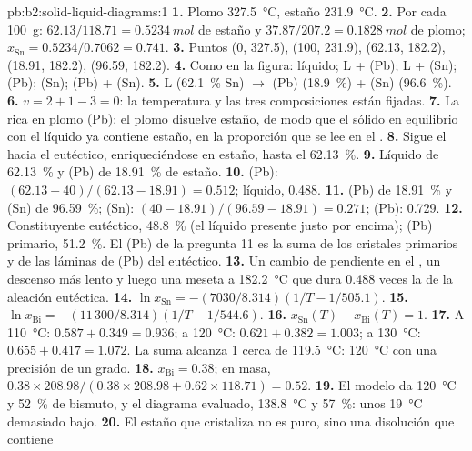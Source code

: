 \begin{solution}{pb:b2:solid-liquid-diagrams:1}
\textbf{1.} Plomo \qty{327.5}{\degreeCelsius}, estaño \qty{231.9}{\degreeCelsius}.
\textbf{2.} Por cada \qty{100}{g}: $62.13/118.71 = \qty{0.5234}{mol}$ de estaño y
$37.87/207.2 = \qty{0.1828}{mol}$ de plomo; $x_{\mathrm{Sn}} = 0.5234/0.7062 =
0.741$.
\textbf{3.} Puntos (0, 327.5), (100, 231.9), (62.13, 182.2), (18.91, 182.2),
(96.59, 182.2).
\textbf{4.} Como en la figura: líquido; L + (Pb); L + (Sn); (Pb); (Sn); (Pb) + (Sn).
\textbf{5.} L (62.1~\% Sn) $\longrightarrow$ (Pb) (18.9~\%) + (Sn) (96.6~\%).
\textbf{6.} $v = 2 + 1 - 3 = 0$: la temperatura y las tres composiciones están
fijadas.
\textbf{7.} La  rica en plomo (Pb): el plomo disuelve estaño, de modo que el sólido en
equilibrio con el líquido ya contiene estaño, en la proporción que se lee en el
.
\textbf{8.} Sigue el  hacia el eutéctico, enriqueciéndose en estaño,
hasta el 62.13~\%.
\textbf{9.} Líquido de 62.13~\% y (Pb) de 18.91~\% de estaño.
\textbf{10.} (Pb): $(62.13 - 40)/(62.13 - 18.91) = 0.512$; líquido, 0.488.
\textbf{11.} (Pb) de 18.91~\% y (Sn) de 96.59~\%; (Sn): $(40 - 18.91)/(96.59 -
18.91) = 0.271$; (Pb): 0.729.
\textbf{12.} Constituyente eutéctico, 48.8~\% (el líquido presente justo por encima);
(Pb) primario, 51.2~\%. El (Pb) de la pregunta 11 es la suma de los cristales primarios
y de las láminas de (Pb) del eutéctico.
\textbf{13.} Un cambio de pendiente en el , un descenso más lento y luego una meseta a
\qty{182.2}{\degreeCelsius} que dura 0.488 veces la de la aleación eutéctica.
\textbf{14.} $\ln x_{\mathrm{Sn}} = -(7030/8.314)(1/T - 1/505.1)$.
\textbf{15.} $\ln x_{\mathrm{Bi}} = -(11\,300/8.314)(1/T - 1/544.6)$.
\textbf{16.} $x_{\mathrm{Sn}}(T) + x_{\mathrm{Bi}}(T) = 1$.
\textbf{17.} A \qty{110}{\degreeCelsius}: $0.587 + 0.349 = 0.936$; a
\qty{120}{\degreeCelsius}: $0.621 + 0.382 = 1.003$; a
\qty{130}{\degreeCelsius}: $0.655 + 0.417 = 1.072$. La suma alcanza 1 cerca de
\qty{119.5}{\degreeCelsius}: \qty{120}{\degreeCelsius} con una precisión de un grado.
\textbf{18.} $x_{\mathrm{Bi}} = 0.38$; en masa, $0.38 \times 208.98/(0.38 \times
208.98 + 0.62 \times 118.71) = 0.52$.
\textbf{19.} El modelo da \qty{120}{\degreeCelsius} y 52~\% de bismuto, y el
diagrama evaluado, \qty{138.8}{\degreeCelsius} y 57~\%: unos
\qty{19}{\degreeCelsius} demasiado bajo.
\textbf{20.} El estaño que cristaliza no es puro, sino una disolución que contiene

\end{solution}
